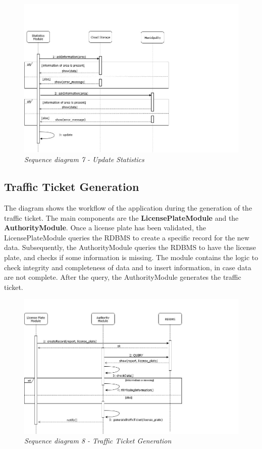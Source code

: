 \begin{figure}[H]
  \centering
  \includegraphics[width=\textwidth]{DD_Images/RunTimeView/7.jpg}
  \caption{\textit{Sequence diagram 7 - Update Statistics}}
\end{figure}

\subsection{Traffic Ticket Generation}
The diagram shows the workflow of the application during the generation of the traffic ticket. The main components are the 
\textbf{LicensePlateModule} and the \textbf{AuthorityModule}. Once a license plate has been validated, the LicensePlateModule queries the 
RDBMS to create a specific record for the new data. Subsequently, the AuthorityModule queries the RDBMS to have the license plate, and checks
if some information is missing. The module contains the logic to check integrity and completeness of data and to insert information, in case data 
are not complete. After the query, the AuthorityModule generates the traffic ticket.

\begin{figure}[H]
  \centering
  \includegraphics[width=\textwidth]{DD_Images/RunTimeView/8.jpg}
  \caption{\textit{Sequence diagram 8 - Traffic Ticket Generation}}
\end{figure}

